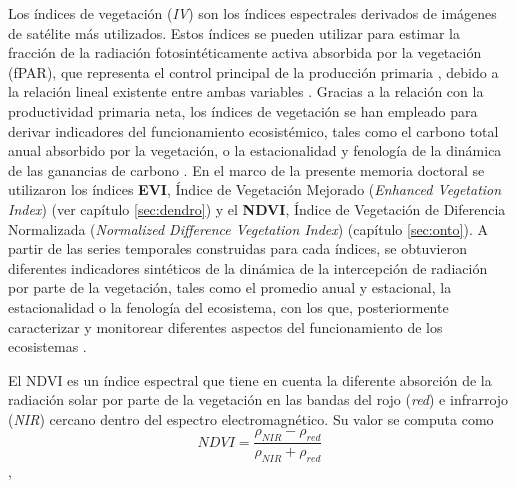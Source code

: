 Los índices de vegetación (\emph{IV}) son los índices espectrales derivados de imágenes de satélite más utilizados. Estos índices se pueden utilizar para estimar la fracción de la radiación fotosintéticamente activa absorbida por la vegetación (fPAR), que representa el control principal de la producción primaria
\autocite{Monteith1972SolarRadiation}, debido a la relación lineal existente entre ambas variables \autocites{Hatfieldetal1984InterceptedPhotosynthetically}. Gracias a la relación con la productividad primaria neta, los índices de vegetación se han empleado para derivar indicadores del funcionamiento ecosistémico, tales como el carbono total anual absorbido por la vegetación, o la estacionalidad y fenología de la dinámica de las ganancias de carbono \autocites{CabelloParuelo2009TeledeteccionEstudios,
AlcarazSeguraetal2009BaselineCharacterization,AlcarazSeguraetal2009UseDescriptors,Cazorlaetal2020RemoteSensingbased,Dionisioetal2012SatelliteBasedMonitoring}. En el marco de la presente memoria doctoral se utilizaron los índices \textbf{EVI}, Índice de Vegetación Mejorado (\emph{Enhanced Vegetation Index}) (ver capítulo \ref{sec:dendro}) y
el \textbf{NDVI}, Índice de Vegetación de Diferencia Normalizada (\emph{Normalized Difference Vegetation Index}) (capítulo \ref{sec:onto}). A partir de las series temporales construidas para cada índices, se obtuvieron
diferentes indicadores sintéticos de la dinámica de la intercepción de radiación por parte de la vegetación, tales como el promedio anual y estacional, la estacionalidad o la fenología del ecosistema, con los
que, posteriormente caracterizar y monitorear diferentes aspectos del funcionamiento de los ecosistemas
\autocite{Cabelloetal2012EcosystemFunctioning}.

El NDVI es un índice espectral que tiene en cuenta la diferente absorción de la radiación solar por parte de la vegetación en las bandas del rojo (\emph{red}) e infrarrojo (\emph{NIR}) cercano dentro del espectro electromagnético. Su valor se computa como \[NDVI = \frac{\rho_{NIR} - \rho_{red}}{\rho_{NIR} + \rho_{red}}\],


